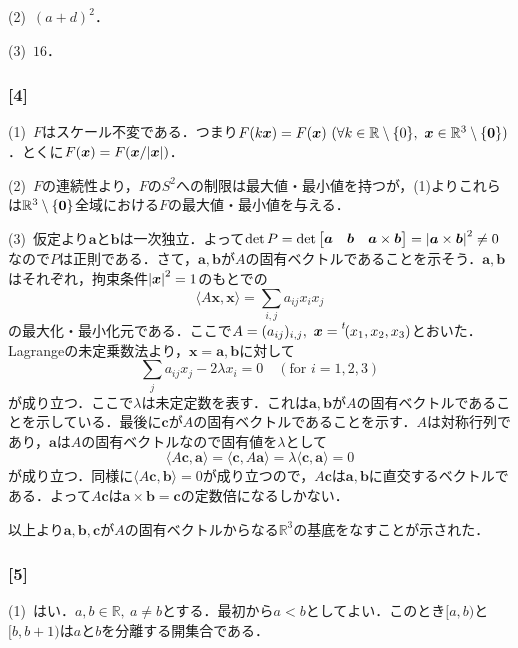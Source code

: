 \documentclass[a4j]{ltjsarticle}
\newcommand{\Rset}{\mathbb{R}}
\newcommand{\1}{\mathbbm{1}}
\newcommand{\transpose}[1]{\prescript{t\!}{}{#1}}
\numberwithin{equation}{section}
\theoremstyle{definition}
\begin{document}
(2)\ $(a+d)^2$．

(3)\ $16$．

\subsubsection*{[4]}
(1)\ $F$はスケール不変である．つまり$F(k\bm{x})=F(\bm{x})\ (\forall k\in\Rset\setminus\qty{0},\ \bm{x}\in \Rset^3\setminus\qty{\bm{0}})$．とくに$F(\bm{x})=F(\bm{x}/\abs{\bm{x}})$．

(2)\ $F$の連続性より，$F$の$S^2$への制限は最大値・最小値を持つが，(1)よりこれらは$\Rset^3\setminus\qty{\bm{0}}$全域における$F$の最大値・最小値を与える．

(3)\ 仮定より$\bm{a}$と$\bm{b}$は一次独立．よって$\det P=\det\begin{bmatrix}
    \bm{a} & \bm{b} & \bm{a}\times \bm{b}
\end{bmatrix}=\abs{\bm{a}\times \bm{b}}^2\neq0$なので$P$は正則である．さて，$\bm{a},\bm{b}$が$A$の固有ベクトルであることを示そう．$\bm{a},\bm{b}$はそれぞれ，拘束条件$\abs{\bm{x}}^2=1$のもとでの
\begin{equation}
    \langle A\bm{x},\bm{x}\rangle =\sum_{i,j}a_{ij}x_ix_j 
\end{equation}
の最大化・最小化元である．ここで$A=(a_{ij})_{i,j},\ \bm{x}=\transpose{(x_1,x_2,x_3)}$とおいた．Lagrangeの未定乗数法より，$\bm{x}=\bm{a},\bm{b}$に対して
\begin{equation}
    \sum_{j}a_{ij}x_j-2\lambda x_i=0\quad (\text{for $i=1,2,3$})
\end{equation}
が成り立つ．ここで$\lambda$は未定定数を表す．これは$\bm{a},\bm{b}$が$A$の固有ベクトルであることを示している．最後に$\bm{c}$が$A$の固有ベクトルであることを示す．$A$は対称行列であり，$\bm{a}$は$A$の固有ベクトルなので固有値を$\lambda$として
\begin{equation}
    \langle A\bm{c},\bm{a}\rangle = \langle \bm{c},A\bm{a}\rangle = \lambda \langle \bm{c},\bm{a}\rangle =0
\end{equation}
が成り立つ．同様に$\langle A\bm{c},\bm{b}\rangle=0$が成り立つので，$A\bm{c}$は$\bm{a},\bm{b}$に直交するベクトルである．よって$A\bm{c}$は$\bm{a}\times \bm{b}=\bm{c}$の定数倍になるしかない．

以上より$\bm{a},\bm{b},\bm{c}$が$A$の固有ベクトルからなる$\Rset^3$の基底をなすことが示された．

\subsubsection*{[5]}
(1)\ はい．$a,b\in\Rset,\ a\neq b$とする．最初から$a<b$としてよい．このとき$[a,b)$と$[b,b+1)$は$a$と$b$を分離する開集合である．
\end{document}
